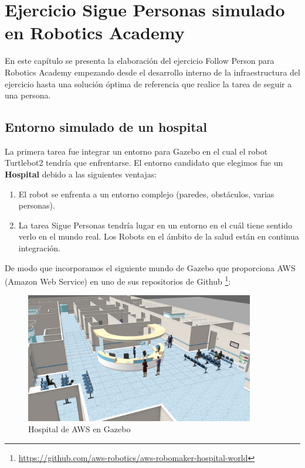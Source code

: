 \chapter{Ejercicio Sigue Personas simulado en Robotics Academy}
\label{cap:capitulo5}

En este capítulo se presenta la elaboración del ejercicio Follow Person para Robotics Academy empezando desde el desarrollo interno de la infraestructura del ejercicio hasta una solución óptima de referencia que realice la tarea de seguir a una persona.



\section{Entorno simulado de un hospital}
\label{sec:hospital_gazebo}

La primera tarea fue integrar un entorno para Gazebo en el cual el robot Turtlebot2 tendría que enfrentarse. El entorno candidato que elegimos fue un \textbf{Hospital} debido a las siguientes ventajas:

\begin{enumerate}
	\item El robot se enfrenta a un entorno complejo (paredes, obstáculos, varias personas).
	\item La tarea Sigue Personas tendría lugar en un entorno en el cuál tiene sentido verlo en el mundo real. Los Robots en el ámbito de la salud están en continua integración.
\end{enumerate}

De modo que incorporamos el siguiente mundo de Gazebo que proporciona AWS (Amazon Web Service) en uno de sus repositorios de Github \footnote{\url{https://github.com/aws-robotics/aws-robomaker-hospital-world}}:

\begin{figure} [H]
  \begin{center}
    \includegraphics[width=10cm]{imagenes/hospital_world.png}
  \end{center}
  \caption[Hospital de AWS en Gazebo]{Hospital de AWS en Gazebo}
  \label{fig:hospital_gazebo}
\end{figure}


